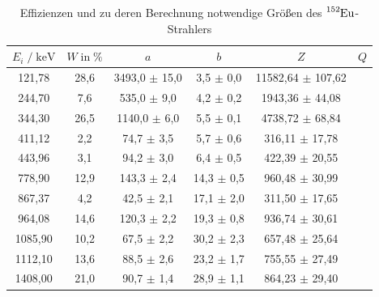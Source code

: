 \begin{table}
  \centering
  \caption{Effizienzen und zu deren Berechnung notwendige Größen des $\ce{^{152}Eu}$-Strahlers}
  \label{tab:mess2}
  \begin{tabular}{c c c c c c}
  \toprule
  $E_i \;/\; \si{\kilo\eV}$ & $W \;\text{in}\; \si{\percent}$ & $a$ & $b$ & $Z$ & $Q$ \\
  \midrule
        121,78 & 28,6 & 3493,0 $\pm$ 15,0 &  3,5 $\pm$ 0,0 & 11582,64 $\pm$ 107,62 &  \\
        244,70 &  7,6 &  535,0 $\pm$  9,0 &  4,2 $\pm$ 0,2 &  1943,36 $\pm$  44,08 &  \\
        344,30 & 26,5 & 1140,0 $\pm$  6,0 &  5,5 $\pm$ 0,1 &  4738,72 $\pm$  68,84 &  \\
        411,12 &  2,2 &   74,7 $\pm$  3,5 &  5,7 $\pm$ 0,6 &   316,11 $\pm$  17,78 &  \\
        443,96 &  3,1 &   94,2 $\pm$  3,0 &  6,4 $\pm$ 0,5 &   422,39 $\pm$  20,55 &  \\
        778,90 & 12,9 &  143,3 $\pm$  2,4 & 14,3 $\pm$ 0,5 &   960,48 $\pm$  30,99 &  \\
        867,37 &  4,2 &   42,5 $\pm$  2,1 & 17,1 $\pm$ 2,0 &   311,50 $\pm$  17,65 &  \\
        964,08 & 14,6 &  120,3 $\pm$  2,2 & 19,3 $\pm$ 0,8 &   936,74 $\pm$  30,61 &  \\
       1085,90 & 10,2 &   67,5 $\pm$  2,2 & 30,2 $\pm$ 2,3 &   657,48 $\pm$  25,64 &  \\
       1112,10 & 13,6 &   88,5 $\pm$  2,6 & 23,2 $\pm$ 1,7 &   755,55 $\pm$  27,49 &  \\
       1408,00 & 21,0 &   90,7 $\pm$  1,4 & 28,9 $\pm$ 1,1 &   864,23 $\pm$  29,40 &  \\
  \bottomrule
  \end{tabular}
  \end{table}




